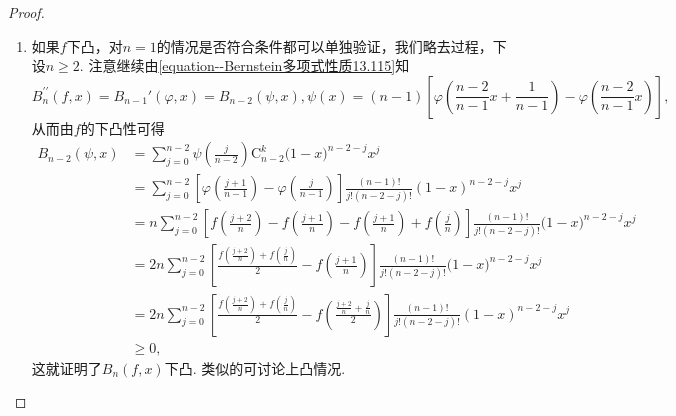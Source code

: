 \documentclass[../../main.tex]{subfiles}%
\begin{document}
\begin{proof}
\begin{enumerate}[(1)]
\item 如果\(f\)下凸，对\(n = 1\)的情况是否符合条件都可以单独验证，我们略去过程，下设\(n\geqslant2\). 注意继续由\eqref{equation--Bernstein多项式性质13.115}知
\[B_n^{\prime\prime}(f,x)=B_{n - 1}'(\varphi,x)=B_{n - 2}(\psi,x),\psi(x)=(n - 1)\left[\varphi\left(\frac{n - 2}{n-1}x+\frac{1}{n-1}\right)-\varphi\left(\frac{n - 2}{n-1}x\right)\right],\]
从而由$f$的下凸性可得
\begin{align*}
B_{n - 2}(\psi,x)&=\sum_{j=0}^{n-2}{\psi \left( \frac{j}{n-2} \right) \mathrm{C}_{n-2}^{k}(1}-x)^{n-2-j}x^j
\\
&=\sum_{j = 0}^{n - 2}\left[\varphi\left(\frac{j + 1}{n - 1}\right)-\varphi\left(\frac{j}{n - 1}\right)\right]\frac{(n - 1)!}{j!(n - 2 - j)!}(1 - x)^{n - 2 - j}x^j
\\
&=n\sum_{j=0}^{n-2}{\left[ f\left( \frac{j+2}{n} \right) -f\left( \frac{j+1}{n} \right) -f\left( \frac{j+1}{n} \right) +f\left( \frac{j}{n} \right) \right] \frac{(n-1)!}{j!(n-2-j)!}(1}-x)^{n-2-j}x^j
\\
&=2n\sum_{j=0}^{n-2}{\left[ \frac{f\left( \frac{j+2}{n} \right) +f\left( \frac{j}{n} \right)}{2}-f\left( \frac{j+1}{n} \right) \right] \frac{(n-1)!}{j!(n-2-j)!}(1}-x)^{n-2-j}x^j
\\
&=2n\sum_{j = 0}^{n - 2}\left[\frac{f\left(\frac{j + 2}{n}\right)+f\left(\frac{j}{n}\right)}{2}-f\left(\frac{\frac{j + 2}{n}+\frac{j}{n}}{2}\right)\right]\frac{(n - 1)!}{j!(n - 2 - j)!}(1 - x)^{n - 2 - j}x^j
\\
&\geqslant0,
\end{align*}
这就证明了\(B_n(f,x)\)下凸. 类似的可讨论上凸情况.


\end{enumerate}
\end{proof}
\end{document}
